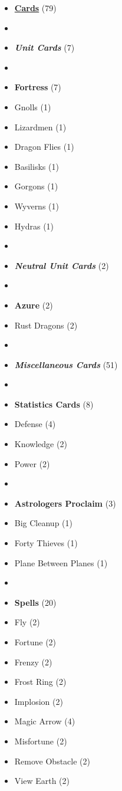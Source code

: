 \begin{multicols*}{3}
\begin{itemize}[leftmargin=0pt, label={}, noitemsep]
  \item \textbf{\small{\underline{Cards}}} (79)
  \item
  \item \textbf{\emph{Unit Cards}} (7)
  \item
  \item \textbf{Fortress} (7)
  \item Gnolls (1)
  \item Lizardmen (1)
  \item Dragon Flies (1)
  \item Basilisks (1)
  \item Gorgons (1)
  \item Wyverns (1)
  \item Hydras (1)
  \item
  \item \textbf{\emph{Neutral Unit Cards}} (2)
  \item
  \item \textbf{Azure} (2)
  \item Rust Dragons (2)
  \item
  \item \textbf{\emph{Miscellaneous Cards}} (51)
  \item
  \item \textbf{Statistics Cards} (8)
  \item Defense (4)
  \item Knowledge (2)
  \item Power (2)
  \item
  \item \textbf{Astrologers Proclaim} (3)
  \item Big Cleanup (1)
  \item Forty Thieves (1)
  \item Plane Between Planes (1)
  \item
  \item \textbf{Spells} (20)
  \item Fly (2)
  \item Fortune (2)
  \item Frenzy (2)
  \item Frost Ring (2)
  \item Implosion (2)
  \item Magic Arrow (4)
  \item Misfortune (2)
  \item Remove Obstacle (2)
  \item View Earth (2)

\end{itemize}
\end{multicols*}
